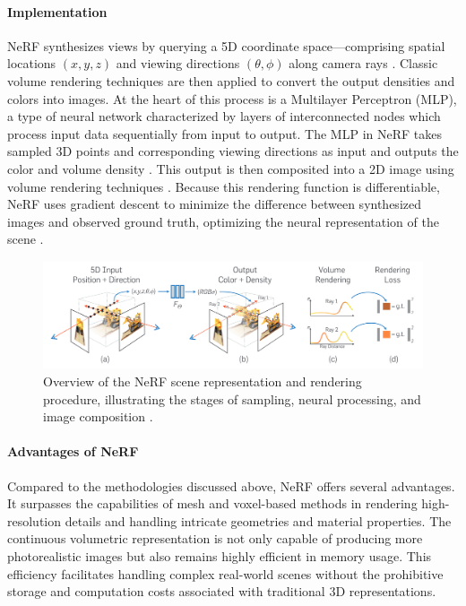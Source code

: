 \paragraph{Implementation}
NeRF synthesizes views by querying a 5D coordinate space—comprising spatial locations \((x, y, z)\) and viewing directions \((\theta, \phi)\) along camera rays .
Classic volume rendering techniques are then applied to convert the output densities and colors into images.
At the heart of this process is a Multilayer Perceptron (MLP), a type of neural network characterized by layers of interconnected nodes which process input data sequentially from input to output.
The MLP in NeRF takes sampled 3D points and corresponding viewing directions as input and outputs the color and volume density  .
This output is then composited into a 2D image using volume rendering techniques  .
Because this rendering function is differentiable, NeRF uses gradient descent to minimize the difference between synthesized images and observed ground truth, optimizing the neural representation of the scene  .

\begin{figure}[h!]
  \centering
  \includegraphics[width=\textwidth]{figures/bg-nerf.png}
  \caption{Overview of the NeRF scene representation and rendering procedure, illustrating the stages of sampling, neural processing, and image composition \cite{mildenhall_nerf_2021}.}
  \label{fig:nerf-overview}
\end{figure}

\paragraph{Advantages of NeRF}
Compared to the methodologies discussed above, NeRF offers several advantages.
It surpasses the capabilities of mesh and voxel-based methods in rendering high-resolution details and handling intricate geometries and material properties.
The continuous volumetric representation is not only capable of producing more photorealistic images but also remains highly efficient in memory usage.
This efficiency facilitates handling complex real-world scenes without the prohibitive storage and computation costs associated with traditional 3D representations.

